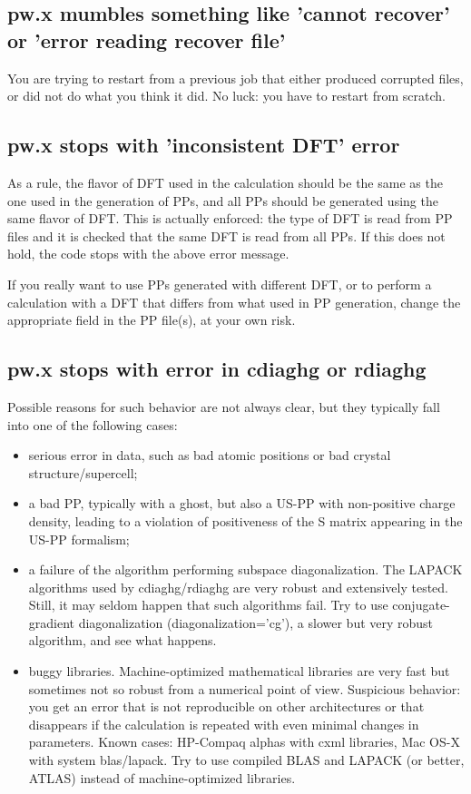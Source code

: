 \documentclass[12pt,a4paper]{article}
\begin{document}
\subsection{pw.x mumbles something like 'cannot recover' or 'error
  reading recover file'} 
You are trying to restart from a previous job that either
produced corrupted files, or did not do what you think it did. No luck: you
have to restart from scratch.

\subsection{pw.x stops with 'inconsistent DFT' error}
As a rule, the flavor of DFT used in the calculation should be the
same as the one used in the generation of PPs, and all PPs should be
generated using the same flavor of DFT. This is actually enforced: the
type of DFT is read from PP files and it is checked that the same DFT
is read from all PPs. If this does not hold, the code stops with the
above error message. 

If you really want to use PPs generated with different DFT, or to perform
a calculation with a DFT that differs from what used in PP generation,
change the appropriate field in the PP file(s), at your own risk.

\subsection{pw.x stops with error in cdiaghg or rdiaghg}
Possible reasons for such behavior are not always clear, but they
typically fall into one of the following cases:
\begin{itemize}
\item serious error in data, such as bad atomic positions or bad
  crystal structure/supercell; 
\item a bad PP, typically with a ghost, but also a US-PP with
  non-positive charge density, leading to a violation of positiveness
  of the S matrix appearing in the US-PP formalism;  
\item a failure of the algorithm performing subspace
  diagonalization. The LAPACK algorithms used by cdiaghg/rdiaghg are
  very robust and extensively tested. Still, it may seldom happen that
  such algorithms fail. Try to use conjugate-gradient diagonalization
  (diagonalization='cg'), a slower but very robust algorithm, and see
  what happens. 
\item buggy libraries. Machine-optimized mathematical libraries are
  very fast but sometimes not so robust from a numerical point of
  view.  Suspicious behavior: you get an error that is not
  reproducible on other architectures or that disappears if the
  calculation is repeated with even minimal changes in
  parameters. Known cases: HP-Compaq alphas with cxml libraries, Mac
  OS-X with system blas/lapack. Try to use compiled BLAS and LAPACK
  (or better, ATLAS) instead of machine-optimized libraries. 
\end{itemize}
\end{document}
